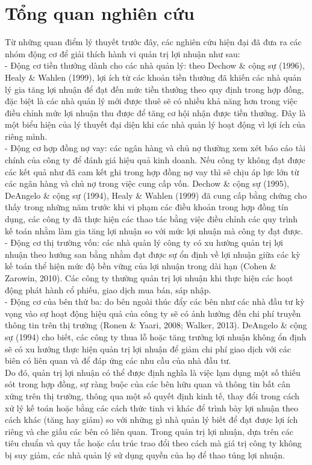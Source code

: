 \documentclass[a4paper]{article}
\begin{document}
\section{Tổng quan nghiên cứu}
Từ những quan điểm lý thuyết trước đây, các nghiên cứu hiện đại đã đưa ra các nhóm động cơ để giải thích hành vi quản trị lợi nhuận như sau:\\
\indent - Động cơ tiền thưởng dành cho các nhà quản lý: theo Dechow \& cộng sự (1996), Healy \& Wahlen (1999), lợi ích từ các khoản tiền thưởng đã khiến các nhà quản lý gia tăng lợi nhuận để đạt đến mức tiền thưởng theo quy định trong hợp đồng, đặc biệt là các nhà quản lý mới được thuê sẽ có nhiều khả năng hơn trong việc điều chỉnh mức lợi nhuận thu được để tăng cơ hội nhận được tiền thưởng. Đây là một biểu hiện của lý thuyết đại diện khi các nhà quản lý hoạt động vì lợi ích của riêng mình.\\
\indent - Động cơ hợp đồng nợ vay: các ngân hàng và chủ nợ thường xem xét báo cáo tài chính của công ty để đánh giá hiệu quả kinh doanh. Nếu công ty không đạt được các kết quả như đã cam kết ghi trong hợp đồng nợ vay thì sẽ chịu áp lực lớn từ các ngân hàng và chủ nợ trong việc cung cấp vốn. Dechow \& cộng sự (1995), DeAngelo \& cộng sự (1994), Healy \& Wahlen (1999) đã cung cấp bằng chứng cho thấy trong những năm trước khi vi phạm các điều khoản trong hợp đồng tín dụng, các công ty đã thực hiện các thao tác bằng việc điều chỉnh các quy trình kế toán nhằm làm gia tăng lợi nhuận so với mức lợi nhuận mà công ty đạt được.\\
\indent - Động cơ thị trường vốn: các nhà quản lý công ty có xu hướng quản trị lợi nhuận theo hướng san bằng nhằm đạt được sự ổn định về lợi nhuận giữa các kỳ kế toán thể hiện mức độ bền vững của lợi nhuận trong dài hạn (Cohen \& Zarowin, 2010). Các công ty thường quản trị lợi nhuận khi thực hiện các hoạt động phát hành cổ phiếu, giao dịch mua bán, sáp nhập.\\
\indent - Động cơ của bên thứ ba: do bên ngoài thúc đẩy các bên như các nhà đầu tư kỳ vọng vào sự hoạt động hiệu quả của công ty sẽ có ảnh hưởng đến chi phí truyền thông tin trên thị trường (Ronen \& Yaari, 2008; Walker, 2013). DeAngelo \& cộng sự (1994) cho biết, các công ty thua lỗ hoặc tăng trưởng lợi nhuận không ổn định sẽ có xu hướng thực hiện quản trị lợi nhuận để giảm chi phí giao dịch với các biên có liên quan và để đáp ứng các nhu cầu của nhà đầu tư.\\
\indent Do đó, quản trị lợi nhuận có thể được định nghĩa là việc lạm dụng một số thiếu sót trong hợp đồng, sự ràng buộc của các bên hữu quan và thông tin bất cân xứng trên thị trường, thông qua một số quyết định kinh tế, thay đổi trong cách xử lý kế toán hoặc bằng các cách thức tinh vi khác để trình bày lợi nhuận theo cách khác (tăng hay giảm) so với những gì nhà quản lý biết để đạt được lợi ích riêng và che giấu các bên có liên quan. Trong quản trị lợi nhuận, dựa trên các tiêu chuẩn và quy tắc hoặc cấu trúc trao đổi theo cách mà giá trị
công ty không bị suy giảm, các nhà quản lý sử dụng quyền của họ để thao túng lợi nhuận.
\end{document}
